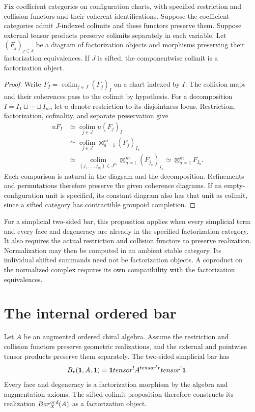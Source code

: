 \begin{proposition}
Fix coefficient categories on configuration charts, with specified
restriction and collision functors and their coherent identifications.
Suppose the coefficient categories admit $J$-indexed colimits
and these functors preserve them.
Suppose external tensor products preserve colimits separately in each variable.
Let $(F_j)_{j\in J}$ be a diagram of factorization objects and
morphisms preserving their factorization equivalences.
If $J$ is sifted, the componentwise colimit is a factorization object.
\end{proposition}
\begin{proof}
Write $F_I=\operatorname*{colim}_{j\in J}(F_j)_I$ on a chart indexed by $I$.
The collision maps and their coherences pass to the colimit by hypothesis.
For a decomposition $I=I_1\sqcup\cdots\sqcup I_m$, let $u$ denote
restriction to its disjointness locus.
Restriction, factorization, cofinality, and separate preservation give
\[
\begin{aligned}
 uF_I
 &\simeq\operatorname*{colim}_{j\in J}u(F_j)_I\\
 &\simeq\operatorname*{colim}_{j\in J}
        \mathop{\boxtimes}_{a=1}^m(F_j)_{I_a}\\
 &\simeq\operatorname*{colim}_{(j_1,\ldots,j_m)\in J^m}
        \mathop{\boxtimes}_{a=1}^m(F_{j_a})_{I_a}
 \simeq\mathop{\boxtimes}_{a=1}^m F_{I_a}.
\end{aligned}
\]
Each comparison is natural in the diagram and the decomposition.
Refinements and permutations therefore preserve the given coherence diagrams.
If an empty-configuration unit is specified, its constant diagram also
has that unit as colimit, since a sifted category has contractible groupoid completion.
\end{proof}

For a simplicial two-sided bar, this proposition applies when every
simplicial term and every face and degeneracy are already in the
specified factorization category.
It also requires the actual restriction and collision functors to preserve realization.
Normalization may then be computed in an ambient stable category.
Its individual shifted summands need not be factorization objects.
A coproduct on the normalized complex requires its own compatibility
with the factorization equivalences.

\section{The internal ordered bar}
Let $A$ be an augmented ordered chiral algebra.
Assume the restriction and collision functors preserve geometric realizations,
and the external and pointwise tensor products preserve them separately.
The two-sided simplicial bar has
\[
 B_r(\mathbf{1},A,\mathbf{1})=
 \mathbf{1}tensor^! A^{tensor^!r}tensor^!\mathbf{1}.
\]
Every face and degeneracy is a factorization morphism by the algebra and augmentation axioms.
The sifted-colimit proposition therefore constructs its realization
$Bar_X^{ord}(A)$ as a factorization object.

